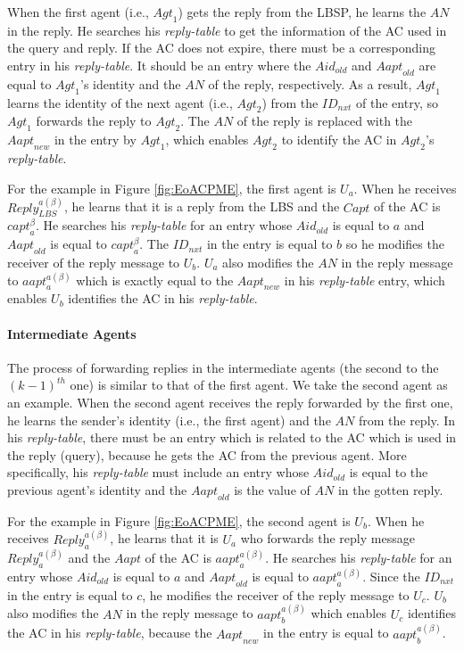 \documentclass[conference]{IEEEtran}
\begin{document}
When the first agent (i.e., ${Agt}_1$) gets the reply from the LBSP, he learns the $AN$ in the reply. He searches his \textit{reply-table} to get the information of the AC used in the query and reply. If the AC does not expire, there must be a corresponding entry in his \textit{reply-table}. It should be an entry where the $Aid_{old}$ and ${Aapt}_{old}$ are equal to ${Agt}_1$'s identity and the $AN$ of the reply, respectively. As a result, ${Agt}_1$ learns the identity of the next agent (i.e., ${Agt}_2$) from the ${ID}_{nxt}$ of the entry, so ${Agt}_1$ forwards the reply to ${Agt}_2$. The $AN$ of the reply is replaced with the ${Aapt}_{new}$ in the entry by ${Agt}_1$, which enables ${Agt}_2$ to identify the AC in ${Agt}_2$'s \textit{reply-table}.

For the example in Figure \ref{fig:EoACPME}, the first agent is $U_a$. When he receives ${Reply}^{a\left(\beta\right)}_{LBS}$, he learns that it is a reply from the LBS and the $Capt$ of the AC is ${capt}^{\beta}_a$. He searches his \textit{reply-table} for an entry whose ${Aid}_{old}$ is equal to $a$ and ${Aapt}_{old}$ is equal to ${capt}^{\beta }_a$. The ${ID}_{nxt}$ in the entry is equal to $b$ so he modifies the receiver of the reply message to $U_b$. $U_a$ also modifies the $AN$ in the reply message to ${aapt}^{a\left(\beta\right)}_a$ which is exactly equal to the ${Aapt}_{new}$ in his \textit{reply-table} entry, which enables $U_b$ identifies the AC in his \textit{reply-table}. 

\paragraph{ Intermediate Agents}

The process of forwarding replies in the intermediate agents (the second to the ${\left(k-1\right)}^{th}$ one) is similar to that of the first agent. We take the second agent as an example. When the second agent receives the reply forwarded by the first one, he learns the sender's identity (i.e., the first agent) and the $AN$ from the reply. In his \textit{reply-table}, there must be an entry which is related to the AC which is used in the reply (query), because he gets the AC from the previous agent. More specifically, his \textit{reply-table} must include an entry whose ${Aid}_{old}$ is equal to the previous agent's identity and the ${Aapt}_{old}$ is the value of $AN$ in the gotten reply.

For the example in Figure \ref{fig:EoACPME}, the second agent is $U_b$. When he receives ${Reply}^{a\left(\beta\right)}_a$, he learns that it is $U_a$ who forwards the reply message ${Reply}^{a\left(\beta\right)}_a$ and the $Aapt$ of the AC is ${aapt}^{a\left(\beta\right)}_a$. He searches his \textit{reply-table} for an entry whose ${Aid}_{old}$ is equal to $a$ and ${Aapt}_{old}$ is equal to ${aapt}^{a\left(\beta\right)}_a$. Since the ${ID}_{nxt}$ in the entry is equal to $c$, he modifies the receiver of the reply message to $U_c$. $U_b$ also modifies the $AN$ in the reply message to ${aapt}^{a\left(\beta\right)}_b$ which enables $U_c$ identifies the AC in his \textit{reply-table}, because the ${Aapt}_{new}$ in the entry is equal to ${aapt}^{a\left(\beta\right)}_b$. 
\end{document}
